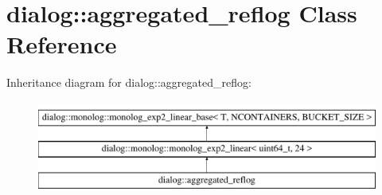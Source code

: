 \hypertarget{classdialog_1_1aggregated__reflog}{}\section{dialog\+:\+:aggregated\+\_\+reflog Class Reference}
\label{classdialog_1_1aggregated__reflog}
Inheritance diagram for dialog\+:\+:aggregated\+\_\+reflog\+:\begin{figure}[H]
\begin{center}
\leavevmode
\includegraphics[height=3.000000cm]{classdialog_1_1aggregated__reflog}
\end{center}
\end{figure}
